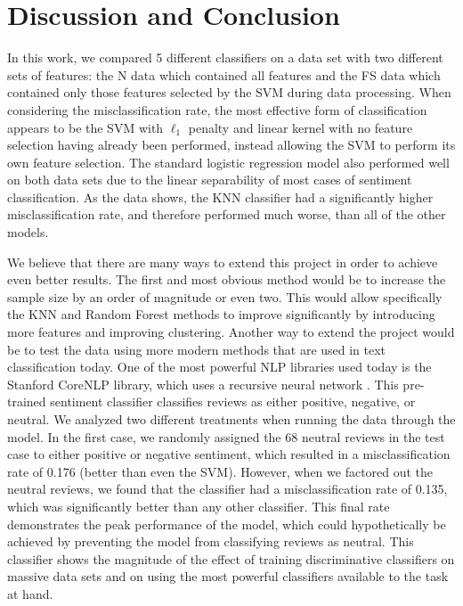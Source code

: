 \documentclass{article} %
\begin{document}
\section{Discussion and Conclusion}
In this work, we compared 5 different classifiers on a data set with two different sets of features: the N data which contained all features and the FS data which contained only those features selected by the SVM during data processing. When considering the misclassification rate, the most effective form of classification appears to be the SVM with $\ell_1$ penalty and linear kernel with no feature selection having already been performed, instead allowing the SVM to perform its own feature selection. The standard logistic regression model also performed well on both data sets due to the linear separability of most cases of sentiment classification. As the data shows, the KNN classifier had a significantly higher misclassification rate, and therefore performed much worse, than all of the other models.

We believe that there are many ways to extend this project in order to achieve even better results. The first and most obvious method would be to increase the sample size by an order of magnitude or even two. This would allow specifically the KNN and Random Forest methods to improve significantly by introducing more features and improving clustering. Another way to extend the project would be to test the data using more modern methods that are used in text classification today. One of the most powerful NLP libraries used today is the Stanford CoreNLP library, which uses a recursive neural network \cite{stanford}. This pre-trained sentiment classifier classifies reviews as either positive, negative, or neutral. We analyzed two different treatments when running the data through the model. In the first case, we randomly assigned the 68 neutral reviews in the test case to either positive or negative sentiment, which resulted in a misclassification rate of 0.176 (better than even the SVM). However, when we factored out the neutral reviews, we found that the classifier had a misclassification rate of 0.135, which was significantly better than any other classifier. This final rate demonstrates the peak performance of the model, which could hypothetically be achieved by preventing the model from classifying reviews as neutral. This classifier shows the magnitude of the effect of training discriminative classifiers on massive data sets and on using the most powerful classifiers available to the task at hand.



\end{document}
